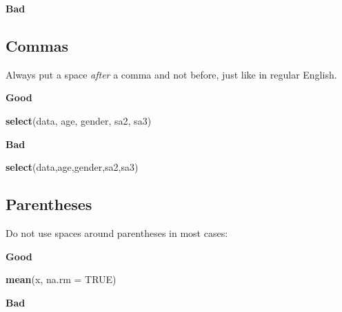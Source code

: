 \documentclass[]{book}
\newenvironment{Shaded}{\begin{snugshade}}{\end{snugshade}}
\newcommand{\DataTypeTok}[1]{\textcolor[rgb]{0.13,0.29,0.53}{#1}}
\newcommand{\DecValTok}[1]{\textcolor[rgb]{0.00,0.00,0.81}{#1}}
\newcommand{\KeywordTok}[1]{\textcolor[rgb]{0.13,0.29,0.53}{\textbf{#1}}}
\newcommand{\NormalTok}[1]{#1}
\newcommand{\OperatorTok}[1]{\textcolor[rgb]{0.81,0.36,0.00}{\textbf{#1}}}
\newcommand{\OtherTok}[1]{\textcolor[rgb]{0.56,0.35,0.01}{#1}}
\newcommand{\StringTok}[1]{\textcolor[rgb]{0.31,0.60,0.02}{#1}}
\begin{document}
\textbf{Bad}

\begin{Shaded}
\end{Shaded}

\hypertarget{commas}{%
\subsection{Commas}\label{commas}}

Always put a space \emph{after} a comma and not before, just like in regular English.

\textbf{Good}

\begin{Shaded}
\begin{Highlighting}[]
\KeywordTok{select}\NormalTok{(data, age, gender, sa2, sa3)}
\end{Highlighting}
\end{Shaded}

\textbf{Bad}

\begin{Shaded}
\begin{Highlighting}[]
\KeywordTok{select}\NormalTok{(data,age,gender,sa2,sa3)}
\end{Highlighting}
\end{Shaded}

\hypertarget{parentheses}{%
\subsection{Parentheses}\label{parentheses}}

Do not use spaces around parentheses in most cases:

\textbf{Good}

\begin{Shaded}
\begin{Highlighting}[]
\KeywordTok{mean}\NormalTok{(x, }\DataTypeTok{na.rm =} \OtherTok{TRUE}\NormalTok{)}
\end{Highlighting}
\end{Shaded}

\textbf{Bad}
\end{document}

